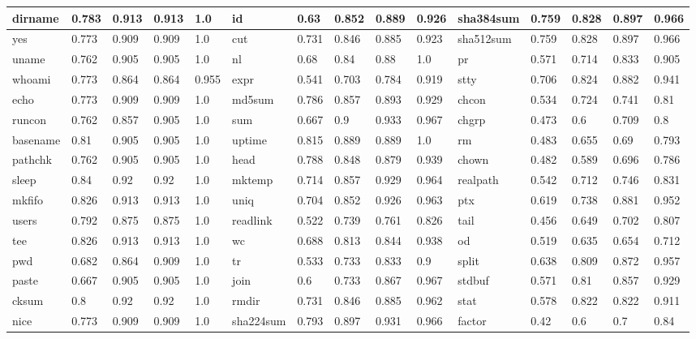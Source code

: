 \begin{table*}[h!]
\begin{center}
\begin{tabular}{ | l | l | l | l | l | l | l | l | l | l | l | l | l | l | l | }
	dirname & 0.783 & 0.913 & 0.913 & 1.0 & id & 0.63 & 0.852 & 0.889 & 0.926 & sha384sum & 0.759 & 0.828 & 0.897 & 0.966 \\ \hline
	yes & 0.773 & 0.909 & 0.909 & 1.0 & cut & 0.731 & 0.846 & 0.885 & 0.923 & sha512sum & 0.759 & 0.828 & 0.897 & 0.966 \\ \hline
	uname & 0.762 & 0.905 & 0.905 & 1.0 & nl & 0.68 & 0.84 & 0.88 & 1.0 & pr & 0.571 & 0.714 & 0.833 & 0.905 \\ \hline
	whoami & 0.773 & 0.864 & 0.864 & 0.955 & expr & 0.541 & 0.703 & 0.784 & 0.919 & stty & 0.706 & 0.824 & 0.882 & 0.941 \\ \hline
	echo & 0.773 & 0.909 & 0.909 & 1.0 & md5sum & 0.786 & 0.857 & 0.893 & 0.929 & chcon & 0.534 & 0.724 & 0.741 & 0.81 \\ \hline
	runcon & 0.762 & 0.857 & 0.905 & 1.0 & sum & 0.667 & 0.9 & 0.933 & 0.967 & chgrp & 0.473 & 0.6 & 0.709 & 0.8 \\ \hline
	basename & 0.81 & 0.905 & 0.905 & 1.0 & uptime & 0.815 & 0.889 & 0.889 & 1.0 & rm & 0.483 & 0.655 & 0.69 & 0.793 \\ \hline
	pathchk & 0.762 & 0.905 & 0.905 & 1.0 & head & 0.788 & 0.848 & 0.879 & 0.939 & chown & 0.482 & 0.589 & 0.696 & 0.786 \\ \hline
	sleep & 0.84 & 0.92 & 0.92 & 1.0 & mktemp & 0.714 & 0.857 & 0.929 & 0.964 & realpath & 0.542 & 0.712 & 0.746 & 0.831 \\ \hline
	mkfifo & 0.826 & 0.913 & 0.913 & 1.0 & uniq & 0.704 & 0.852 & 0.926 & 0.963 & ptx & 0.619 & 0.738 & 0.881 & 0.952 \\ \hline
	users & 0.792 & 0.875 & 0.875 & 1.0 & readlink & 0.522 & 0.739 & 0.761 & 0.826 & tail & 0.456 & 0.649 & 0.702 & 0.807 \\ \hline
	tee & 0.826 & 0.913 & 0.913 & 1.0 & wc & 0.688 & 0.813 & 0.844 & 0.938 & od & 0.519 & 0.635 & 0.654 & 0.712 \\ \hline
	pwd & 0.682 & 0.864 & 0.909 & 1.0 & tr & 0.533 & 0.733 & 0.833 & 0.9 & split & 0.638 & 0.809 & 0.872 & 0.957 \\ \hline
	paste & 0.667 & 0.905 & 0.905 & 1.0 & join & 0.6 & 0.733 & 0.867 & 0.967 & stdbuf & 0.571 & 0.81 & 0.857 & 0.929 \\ \hline
	cksum & 0.8 & 0.92 & 0.92 & 1.0 & rmdir & 0.731 & 0.846 & 0.885 & 0.962 & stat & 0.578 & 0.822 & 0.822 & 0.911 \\ \hline
	nice & 0.773 & 0.909 & 0.909 & 1.0 & sha224sum & 0.793 & 0.897 & 0.931 & 0.966 & factor & 0.42 & 0.6 & 0.7 & 0.84 \\ \hline

\end{tabular}
\end{center}
\end{table*}
